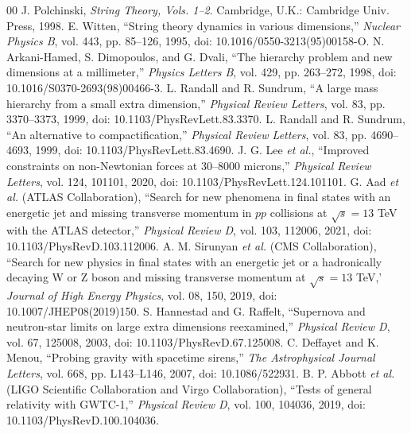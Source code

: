 \documentclass[conference]{IEEEtran}
\begin{document}
\begin{thebibliography}{00}
 J. Polchinski, \emph{String Theory, Vols. 1--2}. Cambridge, U.K.: Cambridge Univ. Press, 1998.
 E. Witten, ``String theory dynamics in various dimensions,'' \emph{Nuclear Physics B}, vol. 443, pp. 85--126, 1995, doi: 10.1016/0550-3213(95)00158-O.
 N. Arkani-Hamed, S. Dimopoulos, and G. Dvali, ``The hierarchy problem and new dimensions at a millimeter,'' \emph{Physics Letters B}, vol. 429, pp. 263--272, 1998, doi: 10.1016/S0370-2693(98)00466-3.
 L. Randall and R. Sundrum, ``A large mass hierarchy from a small extra dimension,'' \emph{Physical Review Letters}, vol. 83, pp. 3370--3373, 1999, doi: 10.1103/PhysRevLett.83.3370.
 L. Randall and R. Sundrum, ``An alternative to compactification,'' \emph{Physical Review Letters}, vol. 83, pp. 4690--4693, 1999, doi: 10.1103/PhysRevLett.83.4690.
 J. G. Lee \emph{et al.}, ``Improved constraints on non-Newtonian forces at 30--8000 microns,'' \emph{Physical Review Letters}, vol. 124, 101101, 2020, doi: 10.1103/PhysRevLett.124.101101.
 G. Aad \emph{et al.} (ATLAS Collaboration), ``Search for new phenomena in final states with an energetic jet and missing transverse momentum in $pp$ collisions at $\sqrt{s}=13$ TeV with the ATLAS detector,'' \emph{Physical Review D}, vol. 103, 112006, 2021, doi: 10.1103/PhysRevD.103.112006.
 A. M. Sirunyan \emph{et al.} (CMS Collaboration), ``Search for new physics in final states with an energetic jet or a hadronically decaying W or Z boson and missing transverse momentum at $\sqrt{s}=13$ TeV,' \emph{Journal of High Energy Physics}, vol. 08, 150, 2019, doi: 10.1007/JHEP08(2019)150.
 S. Hannestad and G. Raffelt, ``Supernova and neutron-star limits on large extra dimensions reexamined,'' \emph{Physical Review D}, vol. 67, 125008, 2003, doi: 10.1103/PhysRevD.67.125008.
 C. Deffayet and K. Menou, ``Probing gravity with spacetime sirens,'' \emph{The Astrophysical Journal Letters}, vol. 668, pp. L143--L146, 2007, doi: 10.1086/522931.
 B. P. Abbott \emph{et al.} (LIGO Scientific Collaboration and Virgo Collaboration), ``Tests of general relativity with GWTC-1,'' \emph{Physical Review D}, vol. 100, 104036, 2019, doi: 10.1103/PhysRevD.100.104036.
\end{thebibliography}
\end{document}
